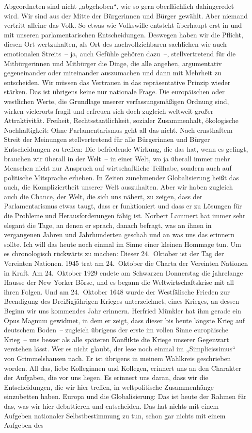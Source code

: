 \documentclass[10pt, a4paper]{report}
\begin{document}
Abgeordneten sind nicht „abgehoben“, wie so gern oberflächlich dahingeredet wird. Wir sind aus der Mitte der Bürgerinnen und Bürger gewählt. Aber niemand vertritt alleine das Volk. So etwas wie Volkswille entsteht überhaupt erst in und mit unseren parlamentarischen Entscheidungen. Deswegen haben wir die Pflicht, diesen Ort wertzuhalten, als Ort des nachvollziehbaren sachlichen wie auch emotionalen Streits – ja, auch Gefühle gehören dazu –, stellvertretend für die Mitbürgerinnen und Mitbürger die Dinge, die alle angehen, argumentativ gegeneinander oder miteinander auszumachen und dann mit Mehrheit zu entscheiden. Wir müssen das Vertrauen in das repräsentative Prinzip wieder stärken. Das ist übrigens keine nur nationale Frage. Die europäischen oder westlichen Werte, die Grundlage unserer verfassungsmäßigen Ordnung sind, wirken vielerorts fragil und erfreuen sich doch zugleich weltweit großer Attraktivität. Freiheit, Rechtsstaatlichkeit, sozialer Zusammenhalt, ökologische Nachhaltigkeit: Ohne Parlamentarismus geht all das nicht. Nach ernsthaftem Streit der Meinungen stellvertretend für alle Bürgerinnen und Bürger Entscheidungen zu treffen: Die befriedende Wirkung, die das hat, wenn es gelingt, brauchen wir überall in der Welt – in einer Welt, wo ja überall immer mehr Menschen nicht nur Anspruch auf wirtschaftliche Teilhabe, sondern auch auf politische Mitsprache erheben. In Zeiten zunehmender Globalisierung heißt das auch, die Kompliziertheit unserer Welt auszuhalten. Aber wir haben zugleich auch die Chance, der Welt, die sich uns nähert, zu zeigen, dass der Parlamentarismus etwas taugt, dass er funktioniert und dass er zu Lösungen für die Probleme und Herausforderungen fähig ist. Norbert Lammert hat immer sehr elegant die Tage, an denen er sprach, danach befragt, was an ihnen in vergangenen Jahren und Jahrhunderten geschah und an was uns das erinnern sollte. Ich will das heute noch einmal im Sinne einer kleinen Hommage tun. Um es chronologisch rückwärts zu machen: Dieser 24. Oktober ist der Tag der Vereinten Nationen. 1945 trat am 24. Oktober die Charta der Vereinten Nationen in Kraft. Am 24. Oktober 1929 endete am Schwarzen Donnerstag die jahrelange Hausse der New Yorker Börse, und es begann die Weltwirtschaftskrise mit all ihren Folgen. Und am 24. Oktober 1648 wurde der Westfälische Frieden zur Beendigung des Dreißigjährigen Krieges unterzeichnet, eines Krieges, an dessen Beginn wir uns kommendes Jahr erinnern. Herfried Münkler hat ihm gerade ein Opus Magnum gewidmet, in dem er zeigt, dass dieser bis heute längste Krieg auf deutschem Boden – zugleich übrigens der erste im vollen Sinne europäische Krieg – uns besser als alle späteren Konflikte die Kriege unserer Gegenwart verstehen lässt. Wer es nicht glaubt, der lese noch einmal im „Simplicissimus“ von ­Grimmelshausen nach. Er ist übrigens in meinem Wahlkreis geschrieben worden. All das, liebe Kolleginnen und Kollegen, erinnert uns an den Charakter der Aufgaben, die vor uns liegen. Es erinnert uns daran, dass wir die Entscheidungen, die wir hier treffen, in weltpolitische Zusammenhänge einzubetten haben. Europa und die Globalisierung: Das ist heute der Rahmen für das, was wir hier debattieren und entscheiden. Das hat nichts mit einem Aufgeben nationaler Selbstbestimmung zu tun, schon gar nichts mit einem Aufgeben des 
\end{document}

